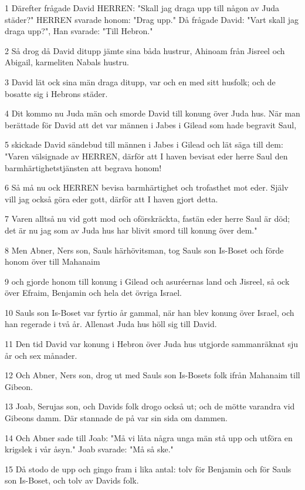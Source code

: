 \par 1 Därefter frågade David HERREN: "Skall jag draga upp till någon av Juda städer?" HERREN svarade honom: "Drag upp." Då frågade David: "Vart skall jag draga upp?", Han svarade: "Till Hebron."
\par 2 Så drog då David ditupp jämte sina båda hustrur, Ahinoam från Jisreel och Abigail, karmeliten Nabals hustru.
\par 3 David lät ock sina män draga ditupp, var och en med sitt husfolk; och de bosatte sig i Hebrons städer.
\par 4 Dit kommo nu Juda män och smorde David till konung över Juda hus. När man berättade för David att det var männen i Jabes i Gilead som hade begravit Saul,
\par 5 skickade David sändebud till männen i Jabes i Gilead och lät säga till dem: "Varen välsignade av HERREN, därför att I haven bevisat eder herre Saul den barmhärtighetstjänsten att begrava honom!
\par 6 Så må nu ock HERREN bevisa barmhärtighet och trofasthet mot eder. Själv vill jag också göra eder gott, därför att I haven gjort detta.
\par 7 Varen alltså nu vid gott mod och oförskräckta, fastän eder herre Saul är död; det är nu jag som av Juda hus har blivit smord till konung över dem."
\par 8 Men Abner, Ners son, Sauls härhövitsman, tog Sauls son Is-Boset och förde honom över till Mahanaim
\par 9 och gjorde honom till konung i Gilead och asuréernas land och Jisreel, så ock över Efraim, Benjamin och hela det övriga Israel.
\par 10 Sauls son Is-Boset var fyrtio år gammal, när han blev konung över Israel, och han regerade i två år. Allenast Juda hus höll sig till David.
\par 11 Den tid David var konung i Hebron över Juda hus utgjorde sammanräknat sju år och sex månader.
\par 12 Och Abner, Ners son, drog ut med Sauls son Is-Bosets folk ifrån Mahanaim till Gibeon.
\par 13 Joab, Serujas son, och Davids folk drogo också ut; och de mötte varandra vid Gibeons damm. Där stannade de på var sin sida om dammen.
\par 14 Och Abner sade till Joab: "Må vi låta några unga män stå upp och utföra en krigslek i vår åsyn." Joab svarade: "Må så ske."
\par 15 Då stodo de upp och gingo fram i lika antal: tolv för Benjamin och för Sauls son Is-Boset, och tolv av Davids folk.
